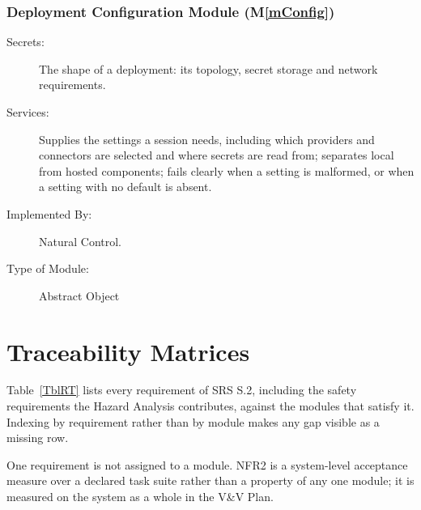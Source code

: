\documentclass[12pt, titlepage]{article}
\newcommand{\progname}{Natural Control}
\newcommand{\mref}[1]{M\ref{#1}}
\begin{document}
\subsubsection{Deployment Configuration Module (\mref{mConfig})}
\begin{description}
\item[Secrets:] The shape of a deployment: its topology, secret storage and
network requirements.
\item[Services:] Supplies the settings a session needs, including which
providers and connectors are selected and where secrets are read from;
separates local from hosted components; fails clearly when a setting is
malformed, or when a setting with no default is absent.
\item[Implemented By:] \progname{}.
\item[Type of Module:] Abstract Object
\end{description}

\section{Traceability Matrices} \label{SecTM}

Table~\ref{TblRT} lists every requirement of SRS S.2, including the safety
requirements the Hazard Analysis contributes, against the modules that satisfy
it. Indexing by requirement rather than by module makes any gap visible as a
missing row.

One requirement is not assigned to a module. NFR2 is a system-level acceptance
measure over a declared task suite rather than a property of any one module; it
is measured on the system as a whole in the V\&V Plan.
\end{document}
